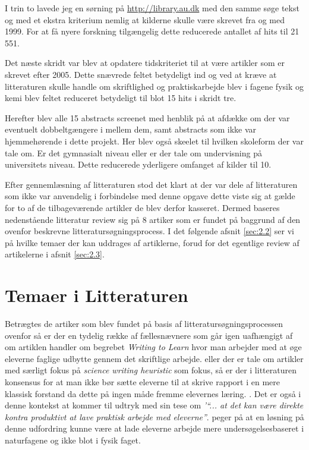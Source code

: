 I trin to lavede jeg en sørning på \url{http://library.au.dk} med den samme søge tekst og med et ekstra kriterium nemlig at kilderne skulle være skrevet fra og med 1999. For at få nyere forskning tilgængelig dette reducerede antallet af hits til 21\,551. 

Det næste skridt var blev at opdatere tidskriteriet til at være artikler som er skrevet efter 2005. Dette snævrede feltet betydeligt ind og ved at kræve at litteraturen skulle handle om skriftlighed og praktiskarbejde blev i fagene fysik og kemi blev feltet reduceret betydeligt til blot 15 hits i skridt tre.

Herefter blev alle 15 abstracts screenet med henblik på at afdække om der var eventuelt dobbeltgængere i mellem dem, samt abstracts som ikke var hjemmehørende i dette projekt. Her blev også skeelet til hvilken skoleform der var tale om. Er det gymnasialt niveau eller er der tale om undervisning på universitets niveau. Dette reducerede yderligere omfanget af kilder til 10.

Efter gennemlæsning af litteraturen stod det klart at der var dele af litteraturen som ikke var anvendelig i forbindelse med denne opgave dette viste sig at gælde for to af de tilbageværende artikler de blev derfor kasseret. Dermed baseres nedenstående litteratur review sig på 8 artiker som er fundet på baggrund af den ovenfor beskrevne litteratursøgningsprocess. I det følgende afsnit \vref{sec:2.2} ser vi på hvilke temaer der kan uddrages af artiklerne, forud for det egentlige review af artikelerne i afsnit \vref{sec:2.3}. 


\section{Temaer i Litteraturen}
\label{sec:2.2}

Betrægtes de artiker som blev fundet på basis af litteratursøgningsprocessen ovenfor så er der en tydelig række af fællesnævnere som går igen uafhængigt af om artiklen handler om begrebet \emph{Writing to Learn} hvor man arbejder med at øge eleverne faglige udbytte gennem det skriftlige arbejde. eller der er tale om artikler med særligt fokus på \emph{science writing heuristic} som fokus, så er der i litteraturen konsensus for at man ikke bør sætte eleverne til at skrive rapport i en mere klassisk forstand da dette på ingen måde fremme elevernes læring. \citep{Akkus2007, Atasoy2013, Burke2005, Keys1999}. Det er også i denne kontekst at \citet{Hodson2008} kommer til udtryk med sin tese om \emph{'``... at det kan være direkte kontra produktivt at lave praktisk arbejde med eleverne''}. \citet{Krogh2016,Dolin2014} peger på at en løsning på denne udfordring kunne være at lade eleverne arbejde mere undersøgelsesbaseret i naturfagene og ikke blot i fysik faget. 


